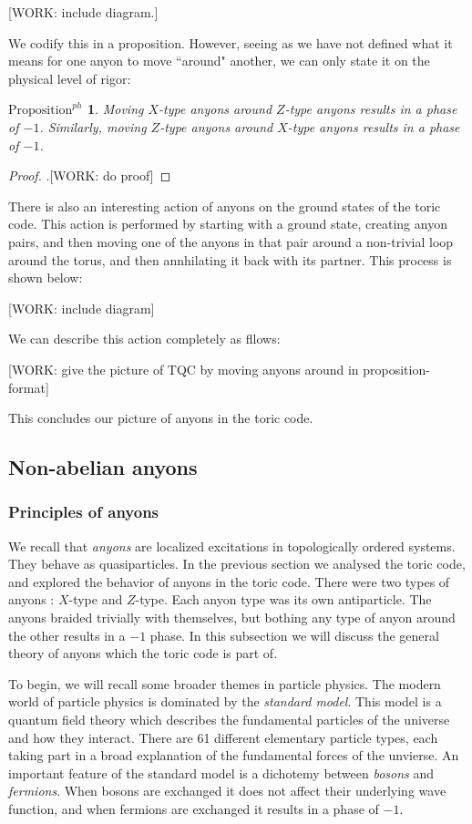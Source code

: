 \documentclass{article}
\newtheorem{propositionph}{$\text{Proposition}^{ph}$}[section]
\theoremstyle{definition}
\numberwithin{figure}{section}
\begin{document}
[WORK: include diagram.]

We codify this in a proposition. However, seeing as we have not defined what it means for one anyon to move ``around" another, we can only state it on the physical level of rigor:

\begin{propositionph} Moving $X$-type anyons around $Z$-type anyons results in a phase of $-1$. Similarly, moving $Z$-type anyons around $X$-type anyons results in a phase of $-1$.
\end{propositionph}
\begin{proof}.[WORK: do proof]
\end{proof}

There is also an interesting action of anyons on the ground states of the toric code. This action is performed by starting with a ground state, creating anyon pairs, and then moving one of the anyons in that pair around a non-trivial loop around the torus, and then annhilating it back with its partner. This process is shown below:

[WORK: include diagram]

We can describe this action completely as fllows:

[WORK: give the picture of TQC by moving anyons around in proposition-format]

This concludes our picture of anyons in the toric code.

\subsection{Non-abelian anyons}

\subsubsection{Principles of anyons}

We recall that \textit{anyons} are localized excitations in topologically ordered systems. They behave as quasiparticles. In the previous section we analysed the toric code, and explored the behavior of anyons in the toric code. There were two types of anyons : $X$-type and $Z$-type. Each anyon type was its own antiparticle. The anyons braided trivially with themselves, but bothing any type of anyon around the other results in a $-1$ phase. In this subsection we will discuss the general theory of anyons which the toric code is part of.

To begin, we will recall some broader themes in particle physics. The modern world of particle physics is dominated by the \textit{standard model}. This model is a quantum field theory which describes the fundamental particles of the universe and how they interact. There are 61 different elementary particle types, each taking part in a broad explanation of the fundamental forces of the unvierse. An important feature of the standard model is a dichotemy between \textit{bosons} and \textit{fermions}. When bosons are exchanged it does not affect their underlying wave function, and when fermions are exchanged it results in a phase of $-1$.
\end{document}

